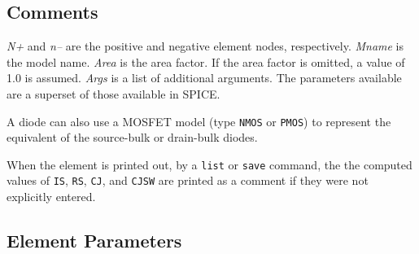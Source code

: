 \subsection{Comments}

{\it N+} and {\it n--} are the positive and negative element nodes,
respectively.  {\it Mname} is the model name.  {\it Area} is the area
factor.  If the area factor is omitted, a value of 1.0 is assumed.
{\it Args} is a list of additional arguments.  The parameters
available are a superset of those available in SPICE.

A diode can also use a MOSFET model (type {\tt NMOS} or {\tt PMOS}) to
represent the equivalent of the source-bulk or drain-bulk diodes.

When the element is printed out, by a {\tt list} or {\tt save}
command, the the computed values of {\tt IS}, {\tt RS}, {\tt CJ}, and
{\tt CJSW} are printed as a comment if they were not explicitly
entered.
\subsection{Element Parameters}

